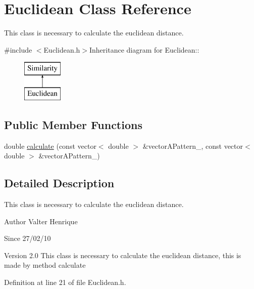 \hypertarget{classEuclidean}{
\section{Euclidean Class Reference}
\label{classEuclidean}
}


This class is necessary to calculate the euclidean distance.  


{\ttfamily \#include $<$Euclidean.h$>$}Inheritance diagram for Euclidean::\begin{figure}[H]
\begin{center}
\leavevmode
\includegraphics[height=2cm]{classEuclidean}
\end{center}
\end{figure}
\subsection*{Public Member Functions}
\begin{DoxyCompactItemize}
\item 
double \hyperlink{classEuclidean_a732c1c959cc6978d4e9050bc42fda186}{calculate} (const vector$<$ double $>$ \&vectorAPattern\_, const vector$<$ double $>$ \&vectorAPattern\_)
\end{DoxyCompactItemize}


\subsection{Detailed Description}
This class is necessary to calculate the euclidean distance. \begin{DoxyAuthor}{Author}
Valter Henrique 
\end{DoxyAuthor}
\begin{DoxySince}{Since}
27/02/10 
\end{DoxySince}
\begin{DoxyVersion}{Version}
2.0 This class is necessary to calculate the euclidean distance, this is made by method calculate 
\end{DoxyVersion}


Definition at line 21 of file Euclidean.h.

